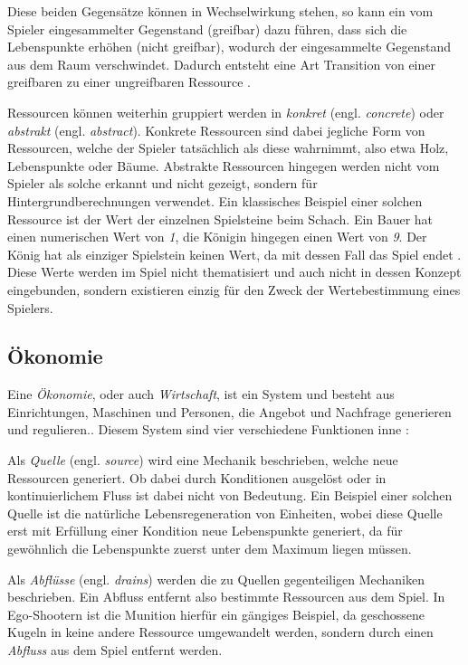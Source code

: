 Diese beiden Gegensätze können in Wechselwirkung stehen, so kann ein vom Spieler eingesammelter Gegenstand (greifbar) dazu führen, dass sich die Lebenspunkte erhöhen (nicht greifbar), wodurch der eingesammelte Gegenstand aus dem Raum verschwindet. Dadurch entsteht eine Art Transition von einer greifbaren zu einer ungreifbaren Ressource \cite*[S.60]{book:gamedesign:resources}. 

Ressourcen können weiterhin gruppiert werden in \textit{konkret} (engl. \textit{concrete}) oder \textit{abstrakt} (engl. \textit{abstract}). Konkrete Ressourcen sind dabei jegliche Form von Ressourcen, welche der Spieler tatsächlich als diese wahrnimmt, also etwa Holz, Lebenspunkte oder Bäume. Abstrakte Ressourcen hingegen werden nicht vom Spieler als solche erkannt und nicht gezeigt, sondern für Hintergrundberechnungen verwendet. Ein klassisches Beispiel einer solchen Ressource ist der Wert der einzelnen Spielsteine beim Schach. Ein Bauer hat einen numerischen Wert von \textit{1}, die Königin hingegen einen Wert von \textit{9}. Der König hat als einziger Spielstein keinen Wert, da mit dessen Fall das Spiel endet \cite*[]{chesspieces}. Diese Werte werden im Spiel nicht thematisiert und auch nicht in dessen Konzept eingebunden, sondern existieren einzig für den Zweck der Wertebestimmung eines Spielers.

\subsection{Ökonomie}
Eine \textit{Ökonomie}, oder auch \textit{Wirtschaft}, ist ein System und \glqq [...] besteht aus Einrichtungen, Maschinen und Personen, die Angebot und Nachfrage generieren und regulieren.\grqq \cite*[]{definition:economy}. Diesem System sind vier verschiedene Funktionen inne \cite*[]{book:gamedesign:economy,article:medium:economy}:

Als \textit{Quelle} (engl. \textit{source}) wird eine Mechanik beschrieben, welche neue Ressourcen generiert. Ob dabei durch Konditionen ausgelöst oder in kontinuierlichem Fluss ist dabei nicht von Bedeutung. Ein Beispiel einer solchen Quelle ist die natürliche Lebensregeneration von Einheiten, wobei diese Quelle erst mit Erfüllung einer Kondition neue Lebenspunkte generiert, da für gewöhnlich die Lebenspunkte zuerst unter dem Maximum liegen müssen.

Als \textit{Abflüsse} (engl. \textit{drains}) werden die zu Quellen gegenteiligen Mechaniken beschrieben. Ein Abfluss entfernt also bestimmte Ressourcen aus dem Spiel. In Ego-Shootern ist die Munition hierfür ein gängiges Beispiel, da geschossene Kugeln in keine andere Ressource umgewandelt werden, sondern durch einen \textit{Abfluss} aus dem Spiel entfernt werden.

